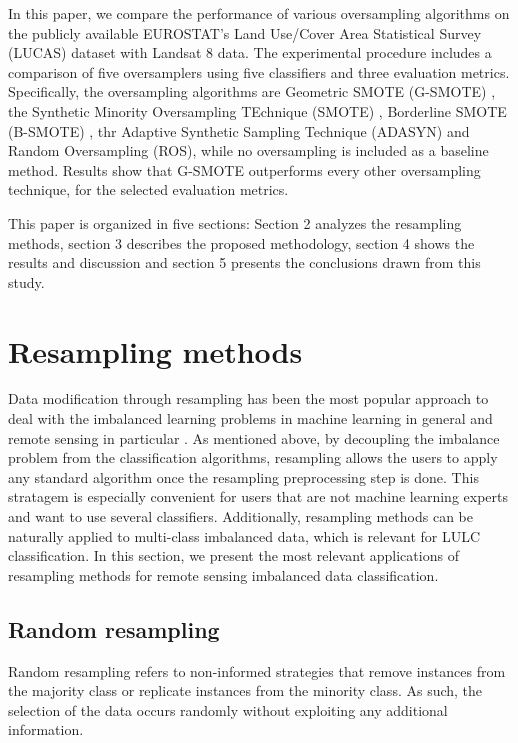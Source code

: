 \documentclass[remotesensing,article,submit,moreauthors,pdftex]{Definitions/mdpi}
\begin{document}
In this paper, we compare the performance of various oversampling algorithms on
the publicly available EUROSTAT's Land Use/Cover Area Statistical Survey
(LUCAS) dataset \cite{LUCAS2015C3} with Landsat 8 data. The experimental
procedure includes a comparison of five oversamplers using five classifiers and
three evaluation metrics. Specifically, the oversampling algorithms are
Geometric SMOTE (G-SMOTE) \cite{Douzas2019}, the Synthetic Minority
Oversampling TEchnique (SMOTE) \cite{Chawla2002}, Borderline SMOTE (B-SMOTE)
\cite{Han2005}, thr Adaptive Synthetic Sampling Technique (ADASYN)
\cite{HaiboHe2008} and Random Oversampling (ROS), while no oversampling is
included as a baseline method. Results show that G-SMOTE outperforms every
other oversampling technique, for the selected evaluation metrics.

This paper is organized in five  sections: Section 2 analyzes the resampling
methods, section 3 describes the proposed methodology, section 4 shows the
results and discussion and section 5 presents the conclusions drawn from this
study.

\section{Resampling methods}

Data modification through resampling has been the most popular approach to deal
with the imbalanced learning problems in machine learning in general and remote
sensing in particular \cite{Feng2019}. As mentioned above, by decoupling the
imbalance problem from the classification algorithms, resampling allows the
users to apply any standard algorithm once the resampling preprocessing step is
done. This stratagem is especially convenient for users that are not machine
learning experts and want to use several classifiers. Additionally, resampling
methods can be naturally applied to multi-class imbalanced data, which is
relevant for LULC classification. In this section, we present the most relevant
applications of resampling methods for remote sensing imbalanced data
classification.

\subsection{Random resampling}

Random resampling refers to non-informed strategies that remove instances from
the majority class or replicate instances from the minority class. As such, the
selection of the data occurs randomly without exploiting any additional
information.
\end{document}
